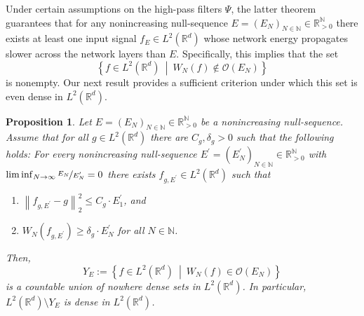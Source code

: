 \documentclass[11pt]{amsart}
\newcommand{\R}{{\mathbb{R}}}
\newcommand{\N}{\mathbb{N}}
\newcommand{\norm}[1]{\ensuremath{\left\lVert\text{}#1\text{}\right\rVert}}
\newtheorem{proposition}[theorem]{Proposition}
\newenvironment{proof sketch} {\textit{Proof sketch.}}{}
\newenvironment{myenum}
{ \begin{enumerate}
    \setlength{\itemsep}{3pt}
    \setlength{\parskip}{0pt}
    \setlength{\parsep}{0pt}     }
{ \end{enumerate}                  }
\begin{document}
  Under certain assumptions on the high-pass filters $\Psi$, the latter theorem  guarantees that for any nonincreasing null-sequence $E=(E_N)_{N \in \N}\in \R_{>0}^\N$ there exists at least one input signal $f_E \in L^2(\R^d)$ whose network energy propagates slower across the network layers than $E$. Specifically, this implies that the set 
  \[\left\{f \in L^2(\R^d) ~\middle|~ W_N(f) \notin \mathcal{O}(E_N)\right\}\]
  is nonempty. Our next result provides a sufficient criterion under which this set is even dense in $L^2(\R^d)$.
  
  \begin{proposition}\label{prop: density of adversarial examples}
    Let $E=(E_N)_{N \in \N}\in \R_{>0}^{\N}$ be a nonincreasing null-sequence. Assume that for all $g \in L^2(\R^d)$ there are $ C_g,\delta_g>0$ such that the following holds: 
    For every nonincreasing null-sequence $E^\prime=(E_N^\prime)_{N \in \N}\in \R_{>0}^{\N}$ with $\liminf_{N \to \infty} \nicefrac{E_N}{E_N^\prime}=0$ there exists $f_{g,E^\prime} \in L^2(\R^d)$ such that
    \begin{myenum}
      \item[(i)] $\norm{f_{g,E^\prime}-g}_2^2\leq C_g \cdot E_1^\prime$, and
      \item[(ii)] $W_N(f_{g,E^\prime})\geq \delta_g \cdot E_N^\prime$ for all $N \in \N$.
    \end{myenum}
    Then, 
    \[Y_E:=\left\{f \in L^2(\R^d) ~\middle|~ W_N(f) \in \mathcal{O}(E_N)\right\}\]
    is a countable union of nowhere dense sets in $L^2(\R^d)$. In particular,  $L^2(\R^d) \setminus Y_E$ is dense in $L^2(\R^d)$.
  \end{proposition}
  
\end{document}
